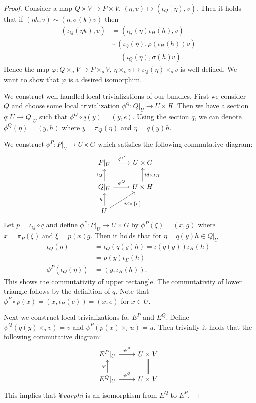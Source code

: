 \documentclass[b5paper]{article}
\begin{document}
  \begin{proof}
    Consider a map $Q \times V \to P \times V$, $(\eta, v) \mapsto (\iota_Q(\eta), v)$.
    Then it holds that if $(\eta h, v) \sim (\eta, \sigma(h)v)$ then
    \begin{align*}
      (\iota_Q(\eta h), v) &= (\iota_Q(\eta) \iota_H(h), v) \\
                           &\sim (\iota_Q(\eta) , \rho(\iota_H(h))v) \\
                           &= (\iota_Q(\eta) , \sigma(h)v).
    \end{align*}
    Hence the map $\varphi: Q \times_\sigma V \to P \times_\rho V$, 
    $\eta \times_\sigma v \mapsto \iota_Q(\eta) \times_\rho v$ is well-defined.
    We want to show that $\varphi$ is a desired isomorphim.

    We construct well-handled local trivializations of our bundles.
    First we consider $Q$ and choose some local trivialization
    $\phi^Q: Q|_U \to U \times H$.
    Then we have a section $q: U \to Q|_U$ such that
    $\phi^Q \circ q (y) = (y, e)$.
    Using the section $q$, we can denote
    $\phi^Q(\eta) = (y, h)$ where $y = \pi_Q(\eta)$ and $\eta = q(y) h$.

    We construct $\phi^P: P|_U \to U \times G$
    which satisfies the following commutative diagram:
    \[
      \begin{tikzcd}
      P|_U \arrow[r, "\phi^P"] 
      & U \times G\\
      Q|_U \arrow[u,"\iota_Q"] \arrow[r, "\phi^Q"] 
      & U \times H \arrow[u, "id \times \iota_H"'] \\
      U \arrow[u, "q"] \arrow[ur, "id \times \{e\}"']
      \end{tikzcd}
    \]
    Let $p = \iota_Q \circ q$ and define $\phi^P: P|_U \to U \times G$ by
    $\phi^P(\xi) = (x, g)$ where $x = \pi_P(\xi)$ and $\xi = p(x) g$.
    Then it holds that for $\eta = q(y)h \in Q|_U$
    \begin{align*}
      \iota_Q(\eta) &= \iota_Q(q(y)h) = \iota(q(y)) \iota_H(h) \\
                    &= p(y) \iota_H(h) \\
      \phi^P(\iota_Q(\eta)) &= (y, \iota_H(h)).
    \end{align*}
    This shows the commutativity of upper rectangle.
    The commutativity of lower triangle follows by the definition of $q$.
    Note that $\phi^P \circ p (x) = (x, \iota_H(e)) = (x, e)$ for $x \in U$.


    Next we construct local trivializations for $E^P$ and $E^Q$.
    Define $\psi^Q(q(y) \times_\sigma v) = v$ and
    $\psi^P(p(x) \times_\sigma u) = u$.
    Then trivially it holds that the following commutative diagram: 
    \[
      \begin{tikzcd}
      E^P|_U \arrow[r, "\psi^P"] 
      & U \times V\\
      E^Q|_U \arrow[u,"\varphi"] \arrow[r, "\psi^Q"] 
      & U \times V \arrow[u, equal]
      \end{tikzcd}
    \]
    This implies that $¥varphi$ is an isomorphism from $E^Q$ to $E^P$.

  \end{proof}
\end{document}
